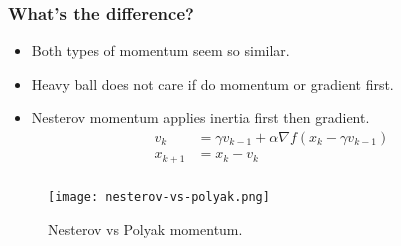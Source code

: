 \documentclass{beamer}
\begin{document}
\begin{frame}
  \frametitle{What's the difference?}
  \begin{itemize}
    \item Both types of momentum seem so similar.
    \item Heavy ball does not care if do momentum or gradient first.
    \item Nesterov momentum applies inertia first then gradient.
          \begin{align}
            v_k &= \gamma v_{k-1} + \alpha \nabla f(x_k - \gamma v_{k-1}) \\
            x_{k+1} &= x_k - v_k
          \end{align}
  \end{itemize}
\end{frame}

\begin{frame}
  \frametitle{}

  \begin{figure}[ht]
    \centering
    \texttt{[image: nesterov-vs-polyak.png]}
    \caption{Nesterov vs Polyak momentum.}
  \end{figure}
\end{frame}

\begin{frame}
  \frametitle{}

\end{frame}
\end{document}
